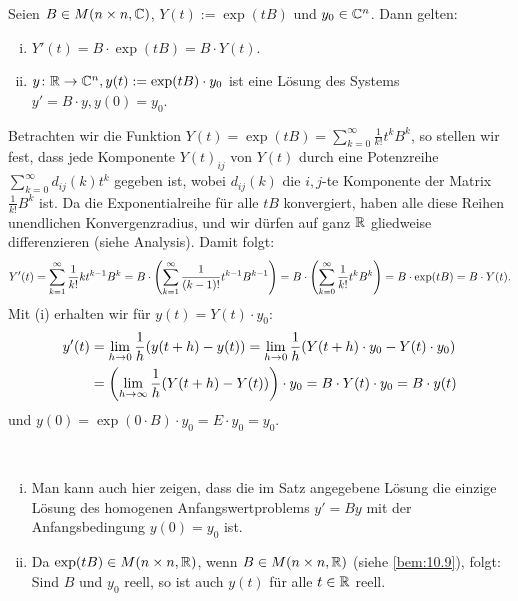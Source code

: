 \begin{satz}
	\label{satz:10.13}
	Seien $B \in M(n \times n,\mathbb{C})$, $Y(t) := \exp(tB)$ und $y_0 \in \mathbb{C}^{n}$.
	Dann gelten:
	\begin{enumerate}[(i)]
		\item $Y'(t) = B \cdot \exp(tB) = B \cdot Y(t)$.
		\item $y\colon \mathbb{R} \rightarrow \mathbb{C}^{n}, y(t) := \exp(tB) \cdot y_0$ ist eine Lösung des Systems $y' = B \cdot y, y(0) = y_0$.
	\end{enumerate}
\end{satz}

\begin{beweis}
	Betrachten wir die Funktion $Y(t) = \exp(tB) = \sum_{k=0}^{\infty} \frac{1}{k!} t^{k} B^{k}$, so stellen wir fest, dass jede Komponente $Y(t)_{ij}$ von $Y(t)$ durch eine Potenzreihe $\sum_{k=0}^{\infty} d_{ij}(k)t^{k}$ gegeben ist, wobei $d_{ij}(k)$ die $i,j$-te Komponente der Matrix $\frac{1}{k!} B^{k}$ ist.
	Da die Exponentialreihe für alle $tB$ konvergiert, haben alle diese Reihen unendlichen Konvergenzradius, und wir dürfen auf ganz $\mathbb{R}$ gliedweise differenzieren (siehe Analysis).
	Damit folgt:	
	\[
		Y'(t) = \sum_{k=1}^{\infty} \frac{1}{k!} kt^{k-1} B^{k} = B \cdot \left(\sum_{k=1}^{\infty} \frac{1}{(k-1)!} t^{k-1} B^{k-1}\right) = B \cdot \left(\sum_{k=0}^{\infty} \frac{1}{k!} t^{k} B^{k}\right) = B \cdot \exp(tB) = B \cdot Y(t).
	\]
	Mit (i) erhalten wir für $y(t) = Y(t) \cdot y_0$:
	\begin{align*}
		y'(t) &= \lim\limits_{h \rightarrow 0} \frac{1}{h} (y(t+h)-y(t)) = \lim\limits_{h \rightarrow 0} \frac{1}{h} (Y(t+h) \cdot y_0 - Y(t) \cdot y_0) \\
		&= \left(\lim\limits_{h \rightarrow \infty} \frac{1}{h}(Y(t+h)-Y(t))\right) \cdot y_0 = B \cdot Y(t) \cdot y_0 = B \cdot y(t)
	\end{align*}
	und $y(0) = \exp(0\cdot B) \cdot y_0 = E \cdot y_0 = y_0$. \qedhere
\end{beweis}

\begin{bemerkung}
	\label{bem:10.14}
	\mbox{} \\[-1.4cm]
	\begin{enumerate}[(i)]
		\item Man kann auch hier zeigen, dass die im Satz angegebene Lösung die einzige Lösung des homogenen Anfangswertproblems $y' = By$ mit der Anfangsbedingung $y(0) = y_0$ ist.
		\item Da $\exp(tB) \in M(n \times n,\mathbb{R})$, wenn $B \in M(n \times n,\mathbb{R})$ (siehe \autoref{bem:10.9}), folgt:
		Sind $B$ und $y_0$ reell, so ist auch $y(t)$ für alle $t \in \mathbb{R}$ reell.
	\end{enumerate}
\end{bemerkung}

